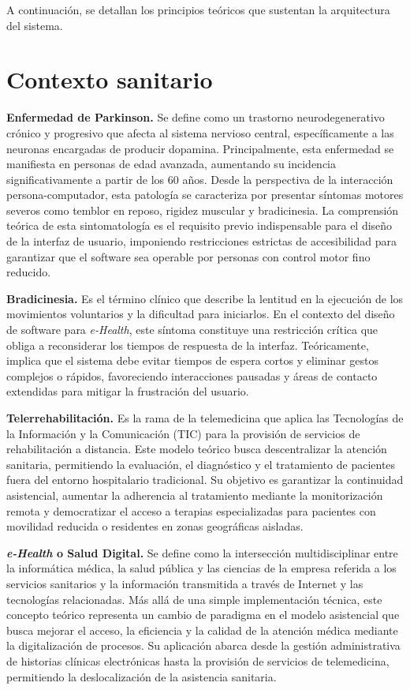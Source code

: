 
A continuación, se detallan los principios teóricos que sustentan la arquitectura del sistema.

\section{Contexto sanitario}

\textbf{Enfermedad de Parkinson.} Se define como un trastorno neurodegenerativo crónico y progresivo que afecta al sistema nervioso central, específicamente a las neuronas encargadas de producir dopamina. Principalmente, esta enfermedad se manifiesta en personas de edad avanzada, aumentando su incidencia significativamente a partir de los 60 años. Desde la perspectiva de la interacción persona-computador, esta patología se caracteriza por presentar síntomas motores severos como temblor en reposo, rigidez muscular y bradicinesia. La comprensión teórica de esta sintomatología es el requisito previo indispensable para el diseño de la interfaz de usuario, imponiendo restricciones estrictas de accesibilidad para garantizar que el software sea operable por personas con control motor fino reducido. \cite{mayo_parkinson}

\textbf{Bradicinesia.} Es el término clínico que describe la lentitud en la ejecución de los movimientos voluntarios y la dificultad para iniciarlos. En el contexto del diseño de software para \textit{e-Health}, este síntoma constituye una restricción crítica que obliga a reconsiderar los tiempos de respuesta de la interfaz. Teóricamente, implica que el sistema debe evitar tiempos de espera cortos y eliminar gestos complejos o rápidos, favoreciendo interacciones pausadas y áreas de contacto extendidas para mitigar la frustración del usuario.  \cite{parkinson_bradicinesia}

\textbf{Telerrehabilitación.} Es la rama de la telemedicina que aplica las Tecnologías de la Información y la Comunicación (TIC) para la provisión de servicios de rehabilitación a distancia. Este modelo teórico busca descentralizar la atención sanitaria, permitiendo la evaluación, el diagnóstico y el tratamiento de pacientes fuera del entorno hospitalario tradicional. Su objetivo es garantizar la continuidad asistencial, aumentar la adherencia al tratamiento mediante la monitorización remota y democratizar el acceso a terapias especializadas para pacientes con movilidad reducida o residentes en zonas geográficas aisladas.

\textbf{\textit{e-Health} o Salud Digital.} Se define como la intersección multidisciplinar entre la informática médica, la salud pública y las ciencias de la empresa referida a los servicios sanitarios y la información transmitida a través de Internet y las tecnologías relacionadas. Más allá de una simple implementación técnica, este concepto teórico representa un cambio de paradigma en el modelo asistencial que busca mejorar el acceso, la eficiencia y la calidad de la atención médica mediante la digitalización de procesos. Su aplicación abarca desde la gestión administrativa de historias clínicas electrónicas hasta la provisión de servicios de telemedicina, permitiendo la deslocalización de la asistencia sanitaria.  \cite{uoc_ehealth}

